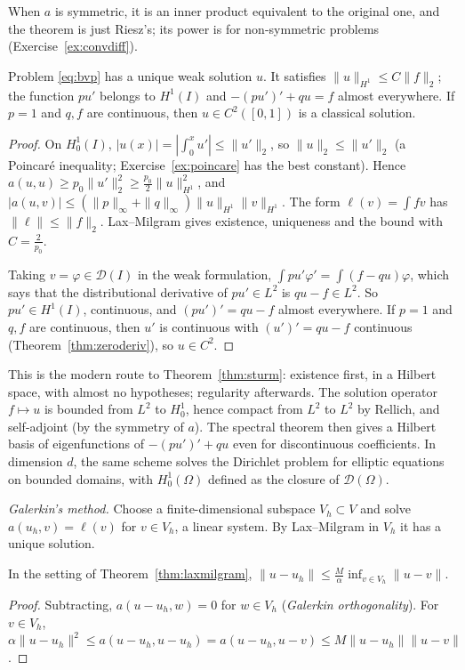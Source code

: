 When $a$ is symmetric, it is an inner product equivalent to the original one, and the theorem is just Riesz's; its power is for non-symmetric problems (Exercise~\ref{ex:convdiff}).

\begin{theorem}\label{thm:weaksol}
Problem \eqref{eq:bvp} has a unique weak solution $u$. It satisfies $\|u\|_{H^1}\le C\|f\|_2$; the function $pu'$ belongs to $H^1(I)$ and $-(pu')'+qu=f$ almost everywhere. If $p=1$ and $q,f$ are continuous, then
$u\in C^2([0,1])$ is a classical solution.
\end{theorem}
\begin{proof}
On $H^1_0(I)$, $|u(x)|=|\int_0^xu'|\le\|u'\|_2$, so $\|u\|_2\le\|u'\|_2$ (a Poincar\'e inequality; Exercise~\ref{ex:poincare} has the best constant). Hence $a(u,u)\ge p_0\|u'\|_2^2\ge\frac{p_0}2\|u\|_{H^1}^2$, and
$|a(u,v)|\le(\|p\|_\infty+\|q\|_\infty)\|u\|_{H^1}\|v\|_{H^1}$. The form $\ell(v)=\int fv$ has $\|\ell\|\le\|f\|_2$. Lax--Milgram gives existence, uniqueness and the bound with $C=\frac2{p_0}$.

Taking $v=\varphi\in\mathcal D(I)$ in the weak formulation, $\int pu'\varphi'=\int(f-qu)\varphi$, which says that the distributional derivative of $pu'\in L^2$ is $qu-f\in L^2$. So $pu'\in H^1(I)$, continuous, and
$(pu')'=qu-f$ almost everywhere. If $p=1$ and $q,f$ are continuous, then $u'$ is continuous with $(u')'=qu-f$ continuous (Theorem~\ref{thm:zeroderiv}), so $u\in C^2$.
\end{proof}

\begin{remark}
This is the modern route to Theorem~\ref{thm:sturm}: existence first, in a Hilbert space, with almost no hypotheses; regularity afterwards. The solution operator $f\mapsto u$ is bounded from $L^2$ to $H^1_0$, hence compact from $L^2$ to $L^2$
by Rellich, and self-adjoint (by the symmetry of $a$). The spectral theorem then gives a Hilbert basis of eigenfunctions of $-(pu')'+qu$ even for discontinuous coefficients. In dimension $d$, the same scheme solves
the Dirichlet problem for elliptic equations on bounded domains, with $H^1_0(\Omega)$ defined as the closure of $\mathcal D(\Omega)$.
\end{remark}

\emph{Galerkin's method.} Choose a finite-dimensional subspace $V_h\subset V$ and solve $a(u_h,v)=\ell(v)$ for $v\in V_h$, a linear system. By Lax--Milgram in $V_h$ it has a unique solution.

\begin{proposition}[C\'ea's lemma]\label{prop:cea}
In the setting of Theorem~\ref{thm:laxmilgram}, $\|u-u_h\|\le\frac M\alpha\inf_{v\in V_h}\|u-v\|$.
\end{proposition}
\begin{proof}
Subtracting, $a(u-u_h,w)=0$ for $w\in V_h$ (\emph{Galerkin orthogonality}). For $v\in V_h$, $\alpha\|u-u_h\|^2\le a(u-u_h,u-u_h)=a(u-u_h,u-v)\le M\|u-u_h\|\|u-v\|$.
\end{proof}

